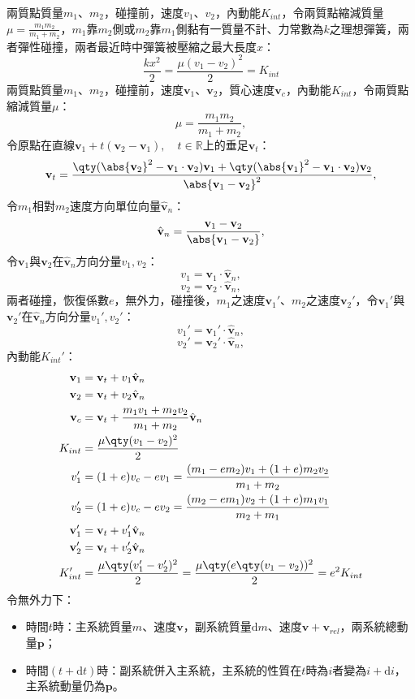\documentclass[a4paper,12pt]{article}
\begin{document}
兩質點質量$m_1$、$m_2$，碰撞前，速度$v_1$、$v_2$，內動能$K_{int}$，令兩質點縮減質量$\mu=\frac{m_1m_2}{m_1+m_2}$，$m_1$靠$m_2$側或$m_2$靠$m_1$側黏有一質量不計、力常數為$k$之理想彈簧，兩者彈性碰撞，兩者最近時中彈簧被壓縮之最大長度$x$：
\[ \frac{kx^2}{2} = \frac{\mu (v_1-v_2)^2}{2} = K_{int} \]
兩質點質量$m_1$、$m_2$，碰撞前，速度$\mathbf{v}_1$、$\mathbf{v}_2$，質心速度$\mathbf{v}_c$，內動能$K_{int}$，令兩質點縮減質量$\mu$：
\[\mu=\frac{m_1m_2}{m_1+m_2},\]
令原點在直線$\mathbf{v}_1+t(\mathbf{v}_2-\mathbf{v}_1),\quad t\in\mathbb{R}$上的垂足$\mathbf{v}_t$：
\[\mathbf{v}_t=\frac{\qty(\abs{\mathbf{v}_2}^2-\mathbf{v}_1\cdot\mathbf{v}_2)\mathbf{v}_1+\qty(\abs{\mathbf{v}_1}^2-\mathbf{v}_1\cdot\mathbf{v}_2)\mathbf{v}_2}{\abs{\mathbf{v}_1-\mathbf{v}_2}^2},\]
令$m_1$相對$m_2$速度方向單位向量$\hat{\mathbf{v}}_n$：
\[\hat{\mathbf{v}}_n=\frac{\mathbf{v}_1-\mathbf{v}_2}{\abs{\mathbf{v}_1-\mathbf{v}_2}},\]
令$\mathbf{v}_1$與$\mathbf{v}_2$在$\hat{\mathbf{v}}_n$方向分量$v_1,v_2$：
\[v_1=\mathbf{v}_1\cdot\hat{\mathbf{v}}_n,\]
\[v_2=\mathbf{v}_2\cdot\hat{\mathbf{v}}_n,\]
兩者碰撞，恢復係數$e$，無外力，碰撞後，$m_1$之速度$\mathbf{v}_1'$、$m_2$之速度$\mathbf{v}_2'$，令$\mathbf{v}_1'$與$\mathbf{v}_2'$在$\hat{\mathbf{v}}_n$方向分量$v_1',v_2'$：
\[v_1'=\mathbf{v}_1'\cdot\hat{\mathbf{v}}_n,\]
\[v_2'=\mathbf{v}_2'\cdot\hat{\mathbf{v}}_n,\]
內動能$K_{int}'$：
\[\begin{aligned}
\mathbf{v}_1&=\mathbf{v}_t+v_1\hat{\mathbf{v}}_n\\
\mathbf{v}_2&=\mathbf{v}_t+v_2\hat{\mathbf{v}}_n\\
\mathbf{v}_c &= \mathbf{v}_t+\frac{m_1v_1+m_2v_2}{m_1+m_2}\hat{\mathbf{v}}_n \\
K_{int} &= \frac{\mu\qty(v_1-v_2)^2}{2}\\
v_1' &= (1+e)v_c - ev_1 = \frac{(m_1-em_2)v_1+(1+e)m_2v_2}{m_1+m_2} \\
v_2' &= (1+e)v_c - ev_2 = \frac{(m_2-em_1)v_2+(1+e)m_1v_1}{m_2+m_1} \\
\mathbf{v}_1'&=\mathbf{v}_t+v_1'\hat{\mathbf{v}}_n\\
\mathbf{v}_2'&=\mathbf{v}_t+v_2'\hat{\mathbf{v}}_n\\
K_{int}' &= \frac{\mu \qty(v_1'-v_2')^2}{2} = \frac{\mu \qty(e\qty(v_1-v_2))^2}{2} = e^2K_{int}
\end{aligned}\]
令無外力下：
\begin{itemize}
\item 時間$t$時：主系統質量$m$、速度$\mathbf{v}$，副系統質量$\mathrm{d}m$、速度$\mathbf{v}+\mathbf{v}_{rel}$，兩系統總動量$\mathbf{p}$；
\item 時間$(t+\mathrm{d}t)$時：副系統併入主系統，主系統的性質在$t$時為$i$者變為$i+\mathrm{d}i$，主系統動量仍為$\mathbf{p}$。
\end{itemize}
\end{document}
